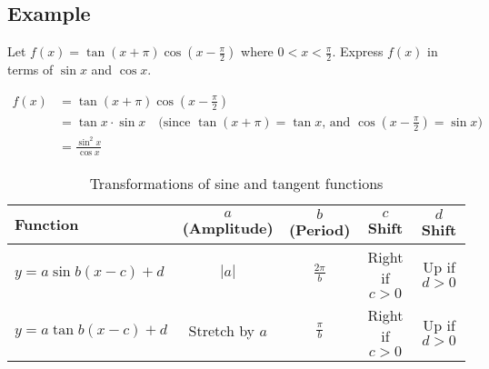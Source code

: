 \documentclass[../main.tex]{subfiles}
\begin{document}
\subsection{Example}

Let $f(x) = \tan(x + \pi) \cos\left(x - \frac{\pi}{2}\right)$ where $0 < x < \frac{\pi}{2}$. Express $f(x)$ in terms of $\sin x$ and $\cos x$.

\begin{align*}
    f(x) &= \tan(x + \pi) \cos\left(x - \frac{\pi}{2}\right) \\
         &= \tan x \cdot \sin x \quad \text{(since $\tan(x + \pi) = \tan x$, and $\cos(x - \frac{\pi}{2}) = \sin x$)} \\
         &= \frac{\sin^2 x}{\cos x}
\end{align*}
\begin{table}[h]
\centering
\renewcommand{\arraystretch}{1.2}
\begin{tabular}{|l|c|c|c|c|}
\hline
Function & $a$ (Amplitude) & $b$ (Period) & $c$ Shift & $d$ Shift \\
\hline
$y = a \sin b(x - c) + d$ & $|a|$ & $\frac{2\pi}{b}$ & Right if $c > 0$ & Up if $d > 0$ \\
\hline
$y = a \tan b(x - c) + d$ & Stretch by $a$ & $\frac{\pi}{b}$ & Right if $c > 0$ & Up if $d > 0$ \\
\hline
\end{tabular}
\caption{Transformations of sine and tangent functions}
\end{table}
\end{document}

